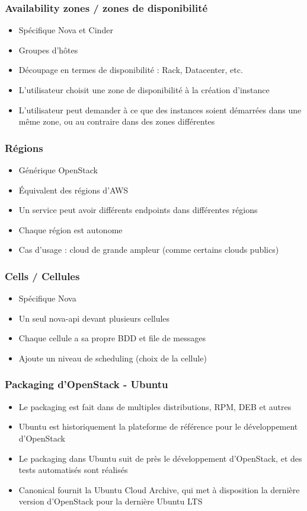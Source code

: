   \begin{frame}
    \frametitle{Availability zones / zones de disponibilité}
    \begin{itemize}
      \item Spécifique Nova et Cinder
      \item Groupes d'hôtes
      \item Découpage en termes de disponibilité : Rack, Datacenter, etc.
      \item L'utilisateur choisit une zone de disponibilité à la création d'instance
      \item L'utilisateur peut demander à ce que des instances soient démarrées dans une même zone, ou au contraire dans des zones différentes
    \end{itemize}
  \end{frame}

  \begin{frame}
    \frametitle{Régions}
    \begin{itemize}
      \item Générique OpenStack
      \item Équivalent des régions d'AWS
      \item Un service peut avoir différents endpoints dans différentes régions
      \item Chaque région est autonome
      \item Cas d'usage : cloud de grande ampleur (comme certains clouds publics)
    \end{itemize}
  \end{frame}

  \begin{frame}
    \frametitle{Cells / Cellules}
    \begin{itemize}
      \item Spécifique Nova
      \item Un seul nova-api devant plusieurs cellules
      \item Chaque cellule a sa propre BDD et file de messages
      \item Ajoute un niveau de scheduling (choix de la cellule)
    \end{itemize}
  \end{frame}

  \begin{frame}
    \frametitle{Packaging d'OpenStack - Ubuntu}
    \begin{itemize}
      \item Le packaging est fait dans de multiples distributions, RPM, DEB et autres\pause
      \item Ubuntu est historiquement la plateforme de référence pour le développement d'OpenStack
      \item Le packaging dans Ubuntu suit de près le développement d'OpenStack, et des tests automatisés sont réalisés
      \item Canonical fournit la Ubuntu Cloud Archive, qui met à disposition la dernière version d'OpenStack pour la dernière Ubuntu LTS
    \end{itemize}
  \end{frame}

